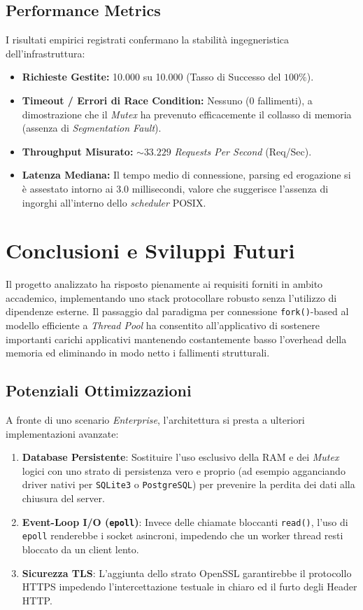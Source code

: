 \documentclass[a4paper,12pt]{article}
\begin{document}
\subsection{Performance Metrics}
I risultati empirici registrati confermano la stabilità ingegneristica dell'infrastruttura:
\begin{itemize}
    \item \textbf{Richieste Gestite:} 10.000 su 10.000 (Tasso di Successo del $100\%$).
    \item \textbf{Timeout / Errori di Race Condition:} Nessuno (0 fallimenti), a dimostrazione che il \textit{Mutex} ha prevenuto efficacemente il collasso di memoria (assenza di \textit{Segmentation Fault}).
    \item \textbf{Throughput Misurato:} $\sim 33.229$ \textit{Requests Per Second} (Req/Sec).
    \item \textbf{Latenza Mediana:} Il tempo medio di connessione, parsing ed erogazione si è assestato intorno ai $3.0$ millisecondi, valore che suggerisce l'assenza di ingorghi all'interno dello \textit{scheduler} POSIX.
\end{itemize}

\newpage
\section{Conclusioni e Sviluppi Futuri}
Il progetto analizzato ha risposto pienamente ai requisiti forniti in ambito accademico, implementando uno stack protocollare robusto senza l'utilizzo di dipendenze esterne. Il passaggio dal paradigma per connessione \texttt{fork()}-based al modello efficiente a \textit{Thread Pool} ha consentito all'applicativo di sostenere importanti carichi applicativi mantenendo costantemente basso l'overhead della memoria ed eliminando in modo netto i fallimenti strutturali.

\subsection{Potenziali Ottimizzazioni}
A fronte di uno scenario \textit{Enterprise}, l'architettura si presta a ulteriori implementazioni avanzate:
\begin{enumerate}
    \item \textbf{Database Persistente}: Sostituire l'uso esclusivo della RAM e dei \textit{Mutex} logici con uno strato di persistenza vero e proprio (ad esempio agganciando driver nativi per \texttt{SQLite3} o \texttt{PostgreSQL}) per prevenire la perdita dei dati alla chiusura del server.
    \item \textbf{Event-Loop I/O (\texttt{epoll})}: Invece delle chiamate bloccanti \texttt{read()}, l'uso di \texttt{epoll} renderebbe i socket asincroni, impedendo che un worker thread resti bloccato da un client lento.
    \item \textbf{Sicurezza TLS}: L'aggiunta dello strato OpenSSL garantirebbe il protocollo HTTPS impedendo l'intercettazione testuale in chiaro ed il furto degli Header HTTP.
\end{enumerate}
\end{document}
